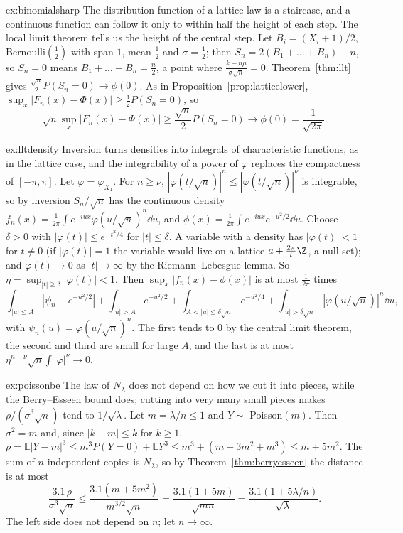 \begin{solution}{ex:binomialsharp}
\idea The distribution function of a lattice law is a staircase, and a continuous function can follow it only to within half the height of each step.
The local limit theorem tells us the height of the central step.
\writeup Let $B_i=(X_i+1)/2$, Bernoulli$(\frac12)$ with span $1$, mean $\frac12$ and $\sigma=\frac12$; then $S_n=2(B_1+\dots+B_n)-n$, so $S_n=0$ means
$B_1+\dots+B_n=\frac n2$, a point where $\frac{k-n\mu}{\sigma\sqrt n}=0$. Theorem~\ref{thm:llt} gives $\frac{\sqrt n}2P(S_n=0)\to\phi(0)$. As in
Proposition~\ref{prop:latticelower}, $\sup_x|F_n(x)-\Phi(x)|\ge\frac12P(S_n=0)$, so
\[
\sqrt n\sup_x|F_n(x)-\Phi(x)|\ge\frac{\sqrt n}2P(S_n=0)\to\phi(0)=\frac1{\sqrt{2\pi}}.
\]
\end{solution}

\begin{solution}{ex:lltdensity}
\idea Inversion turns densities into integrals of characteristic functions, as in the lattice case, and the integrability of a power of $\varphi$
replaces the compactness of $[-\pi,\pi]$.
\writeup Let $\varphi=\varphi_{X_1}$. For $n\ge\nu$, $|\varphi(t/\sqrt n)|^n\le|\varphi(t/\sqrt n)|^\nu$ is integrable, so by inversion $S_n/\sqrt n$ has the continuous
density $f_n(x)=\frac1{2\pi}\int e^{-iux}\varphi(u/\sqrt n)^n\dd u$, and $\phi(x)=\frac1{2\pi}\int e^{-iux}e^{-u^2/2}\dd u$. Choose $\delta>0$ with
$|\varphi(t)|\le e^{-t^2/4}$ for $|t|\le\delta$. A variable with a density has $|\varphi(t)|<1$ for $t\ne0$ (if $|\varphi(t)|=1$ the variable would live on a
lattice $a+\frac{2\pi}t\Z$, a null set); and $\varphi(t)\to0$ as $|t|\to\infty$ by the Riemann--Lebesgue lemma. So $\eta=\sup_{|t|\ge\delta}|\varphi(t)|<1$.
Then $\sup_x|f_n(x)-\phi(x)|$ is at most $\frac1{2\pi}$ times
\[
\int_{|u|\le A}|\psi_n-e^{-u^2/2}|+\int_{|u|>A}e^{-u^2/2}+\int_{A<|u|\le\delta\sqrt n}e^{-u^2/4}+\int_{|u|>\delta\sqrt n}|\varphi(u/\sqrt n)|^n\dd u,
\]
with $\psi_n(u)=\varphi(u/\sqrt n)^n$. The first tends to $0$ by the central limit theorem, the second and third are small for large $A$, and the last is at
most $\eta^{n-\nu}\sqrt n\int|\varphi|^\nu\to0$.
\end{solution}

\begin{solution}{ex:poissonbe}
\idea The law of $N_\lambda$ does not depend on how we cut it into pieces, while the Berry--Esseen bound does; cutting into very many small pieces makes
$\rho/(\sigma^3\sqrt n)$ tend to $1/\sqrt\lambda$.
\writeup Let $m=\lambda/n\le1$ and $Y\sim$ Poisson$(m)$. Then $\sigma^2=m$ and, since $|k-m|\le k$ for $k\ge1$,
$\rho=\mathbb E|Y-m|^3\le m^3P(Y=0)+\mathbb EY^3\le m^3+(m+3m^2+m^3)\le m+5m^2$. The sum of $n$ independent copies is $N_\lambda$, so by Theorem~\ref{thm:berryesseen}
the distance is at most
\[
\frac{3.1\,\rho}{\sigma^3\sqrt n}\le\frac{3.1(m+5m^2)}{m^{3/2}\sqrt n}=\frac{3.1(1+5m)}{\sqrt{mn}}=\frac{3.1(1+5\lambda/n)}{\sqrt\lambda}.
\]
The left side does not depend on $n$; let $n\to\infty$.
\end{solution}

